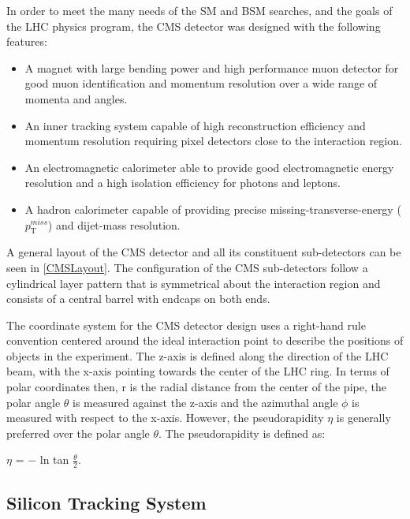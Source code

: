 In order to meet the many needs of the SM and BSM searches, and the goals of the LHC physics program, the CMS detector was designed with the following features:\\
\begin{itemize}
	\itemsep-1em
	\item{A magnet with large bending power and high performance muon detector for good muon identification and momentum resolution over a wide range of momenta and angles.}\\
	\item{An inner tracking system capable of high reconstruction efficiency and momentum resolution requiring pixel detectors close to the interaction region.}\\
	\item{An electromagnetic calorimeter able to provide good electromagnetic energy resolution and a high isolation efficiency for photons and leptons.}\\
	\item{A hadron calorimeter capable of providing precise missing-transverse-energy ($p_\text{T}^{miss}$)  and dijet-mass resolution.}\\
\end{itemize}

A general layout of the CMS detector and all its constituent sub-detectors can be seen in \autoref{CMSLayout}. The configuration of the CMS sub-detectors follow a cylindrical layer pattern that is symmetrical about the interaction region and consists of a central barrel with endcaps on both ends.

The coordinate system for the CMS detector design uses a right-hand rule convention centered around the ideal interaction point to describe the positions of objects in the experiment. The z-axis is defined along the direction of the LHC beam, with the x-axis pointing towards the center of the LHC ring. In terms of polar coordinates then, r is the radial distance from the center of the pipe, the polar angle $\theta$ is measured against the z-axis and the azimuthal angle $\phi$ is measured with respect to the x-axis. However, the pseudorapidity $\eta$ is generally preferred over the polar angle $\theta$. The pseudorapidity is defined as:

\begin{center}
$\eta$ =  $-$ ln tan $\frac{\theta}{2}$.
\end{center}

\subsection{Silicon Tracking System}

